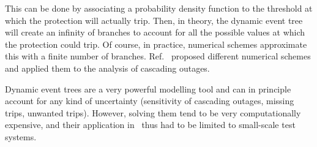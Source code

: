This can be done by associating a probability density function to the threshold at which the protection will actually trip. Then, in theory, the dynamic event tree will create an infinity of branches to account for all the possible values at which the protection could trip. Of course, in practice, numerical schemes approximate this with a finite number of branches. Ref.~\cite{PierreIEEEtran, Faghihi, PierreMCDETprelim} proposed different numerical schemes and applied them to the analysis of cascading outages.



Dynamic event trees are a very powerful modelling tool and can in principle account for any kind of uncertainty (sensitivity of cascading outages, missing trips, unwanted trips). However, solving them tend to be very computationally expensive, and their application in~\cite{PierreIEEEtran, Faghihi, PierreMCDETprelim} thus had to be limited to small-scale test systems.

